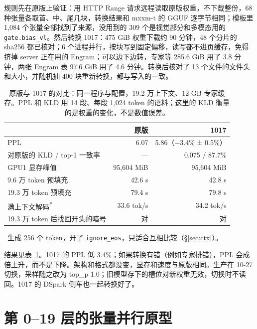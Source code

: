 \documentclass[11pt,a4paper]{article}
\newcommand{\code}[1]{\texttt{#1}}
\newcommand{\tps}{tok/s}
\begin{document}
规则先在原版上验证：用 HTTP Range 请求远程读取原版权重，不下载整份，68 种张量各取首、中、尾几块，转换结果和 mxxm-t 的 GGUF 逐字节相同；模板里 1,084 个张量全部找到了来源，没用到的 309 个是视觉部分和多模态用的 \code{gate.bias\_vl}。然后转换 1017：475 GiB 权重下载约 90 分钟，48 个分片的 sha256 都已核对；6 个进程并行，按块写到固定偏移，读写都不进页缓存，免得挤掉 server 正在用的 Engram；可以边下边转，专家等 285.6 GiB 用了 3.8 分钟，两张 Engram 表 97.6 GiB 用了 4.6 分钟。转换后核对了 13 个文件的文件头和大小，并随机抽 400 块重新转换，都与写入的一致。

\begin{table}[h]
  \centering
  \small
  \caption{原版与 1017 的对比：同一程序与配置，19.2 万上下文、12 GB 专家缓存。PPL 和 KLD 用 14 段、每段 1,024 token 的语料；这里的 KLD 衡量的是权重的变化，不是数值误差。}
  \label{tab:w1017}
  \begin{tabular}{@{}l r r@{}}
    \toprule
     & 原版 & 1017 \\
    \midrule
    PPL & 6.07 & 5.86（$-$3.4\% ± 0.5\%） \\
    对原版的 KLD / top-1 一致率 & — & 0.075 / 87.7\% \\
    GPU1 显存峰值 & 95,604 MiB & 95,604 MiB \\
    9.6 万 token 预填充 & 42.6 s & 42.8 s \\
    19.3 万 token 预填充 & 79.4 s & 79.8 s \\
    满上下文解码\textsuperscript{*} & 33.6 \tps{} & 34.2 \tps{} \\
    19.3 万 token 后找回开头的暗号 & 对 & 对 \\
    \bottomrule
  \end{tabular}
  \par\smallskip\footnotesize *\ 生成 256 个 token，开了 \code{ignore\_eos}，只适合互相比较（\S\ref{sec:ctx}）。
\end{table}

结果见表~\ref{tab:w1017}。1017 的 PPL 低 3.4\%；如果转换有错（例如专家排错），PPL 会成倍上升，而不是下降。架构和格式都没变，显存和速度与原版相同。生产在 10-27 切换，采样随之改为 top\_p 1.0；旧模型存下的槽位对新权重无效，切换时不读回。1017 的 DSpark 侧车也一起转换好了。

\section{第 0--19 层的张量并行原型}
\label{sec:tp}
\end{document}
